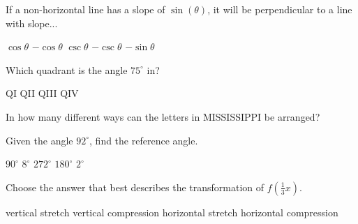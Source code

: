 \documentclass[addpoints]{exam}
\begin{document}
    \begin{questions}
    \setcounter{question}{0}
    \question[1] If a non-horizontal line has a slope of $\sin(\theta)$, it will be perpendicular to a line with slope...
    
    \begin{oneparchoices}
        \choice $\cos\theta$ 
        \choice $-\cos\theta$
        \choice $\csc\theta$
        \choice $-\csc\theta$
        \choice $-\sin\theta$
        \end{oneparchoices}  \answerline
    
    \question[1] Which quadrant is the angle $75^\circ$ in?

    \begin{oneparchoices}
        \choice QI 
        \choice QII
        \choice QIII
        \choice QIV
        \end{oneparchoices}  \answerline
        
    \question[1] In how many different ways can the letters in MISSISSIPPI be arranged?
    
    \begin{oneparchoices}
        \end{oneparchoices}  \answerline
        
    \question[1] Given the angle $92^\circ$, find the reference angle.
    
    \begin{oneparchoices}
        \choice $90^\circ$
        \choice $8^\circ$
        \choice $272^\circ$
        \choice $180^\circ$
        \choice $2^\circ$
        \end{oneparchoices}  \answerline
        
    
    \question[1] Choose the answer that best describes the transformation of $f(\frac{1}{3}x)$.
    
     \begin{oneparchoices}
        \choice vertical stretch
        \choice vertical compression
        \choice horizontal stretch
        \choice horizontal compression
        \end{oneparchoices}  \answerline
    

\end{questions}
\end{document}

